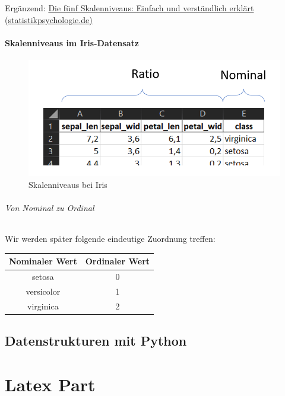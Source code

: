 \documentclass[
  oneside]{book}
\begin{document}
Ergänzend: \href{https://www.statistikpsychologie.de/skalenniveaus/}{Die fünf Skalenniveaus: Einfach und verständlich erklärt (statistikpsychologie.de)}

\hypertarget{skalenniveaus-im-iris-datensatz}{%
\subsection{Skalenniveaus im Iris-Datensatz}\label{skalenniveaus-im-iris-datensatz}}

\begin{figure}
\centering
\includegraphics{assets/daten.assets/image-20211209145313372.png}
\caption{Skalenniveaus bei Iris}
\end{figure}

\hypertarget{von-nominal-zu-ordinal}{%
\paragraph{Von Nominal zu Ordinal}\label{von-nominal-zu-ordinal}}

Wir werden später folgende eindeutige Zuordnung treffen:

\begin{longtable}[]{@{}cc@{}}
\toprule
Nominaler Wert & Ordinaler Wert \\
\midrule
\endhead
setosa & 0 \\
versicolor & 1 \\
virginica & 2 \\
\bottomrule
\end{longtable}

\hypertarget{datenstrukturen-mit-python}{%
\chapter{Datenstrukturen mit Python}\label{datenstrukturen-mit-python}}

\hypertarget{part-latex-part}{%
\part*{Latex Part}\label{part-latex-part}}
\end{document}
